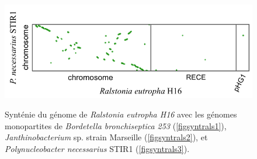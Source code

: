 \begin{figure}[H]
\begin{center}
\begin{minipage}{0.5\textwidth}
		\includegraphics[width=\textwidth]{./img/synteny/new/fig8_11c.png}
		\label{figsyntrals3}
	\end{minipage}
\caption[Synténie de \textit{Ralstonia} \textit{vs.} autres Burkholderiales]{Synténie du génome de \textit{Ralstonia eutropha H16} avec les génomes monopartites de \textit{Bordetella bronchiseptica 253} (\ref{figsyntrals1}), \textit{Janthinobacterium} sp. strain Marseille (\ref{figsyntrals2}), et \textit{Polynucleobacter necessarius} STIR1 (\ref{figsyntrals3}).}\label{figsyntrals}
\end{center} 
\end{figure}  

